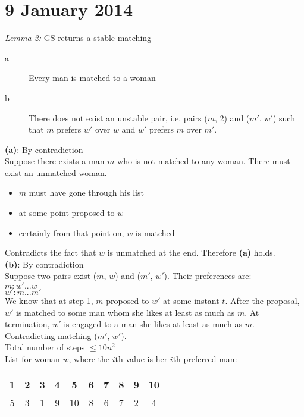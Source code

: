 \section{9 January 2014}
\emph{Lemma 2:} G{\textendash}S returns a stable matching
\begin{description}
\item[a] Every man is matched to a woman
\item[b] There does not exist an unstable pair, i.e. pairs ($m$, $2$) and ($m'$, $w'$) such that $m$ prefers $w'$ over $w$ and $w'$ prefers $m$ over $m'$.
\end{description}

\textbf{(a)}: By contradiction\\
Suppose there exists a man $m$ who is not matched to any woman. There must exist an unmatched woman.
\begin{itemize}
\item $m$ must have gone through his list
\item at some point proposed to $w$
\item certainly from that point on, $w$ is matched
\end{itemize}
Contradicts the fact that $w$ is unmatched at the end. Therefore \textbf{(a)} holds.\\

\textbf{(b)}: By contradiction\\
Suppose two pairs exist ($m$, $w$) and ($m'$, $w'$). Their preferences are:\\
$m: w'...w$\\
$w': m...m'$\\
We know that at step 1, $m$ proposed to $w'$ at some instant $t$. After the proposal, $w'$ is matched to some man whom she likes at least as much as $m$. At termination, $w'$ is engaged to a man she likes at least as much as $m$. Contradicting matching ($m'$, $w'$).\\

Total number of steps $\leq 10n^2$\\
List for woman $w$, where the $i$th value is her $i$th preferred man:\\
\begin{tabular}{ c c c c c c c c c c }
1 & 2 & 3 & 4 & 5 & 6 & 7 & 8 & 9 & 10 \\ \hline
\multicolumn{1}{|c|}{5} & \multicolumn{1}{|c|}{3} & \multicolumn{1}{|c|}{1} & \multicolumn{1}{|c|}{9} & \multicolumn{1}{|c|}{10} & \multicolumn{1}{|c|}{8} & \multicolumn{1}{|c|}{6} & \multicolumn{1}{|c|}{7} & \multicolumn{1}{|c|}{2} & \multicolumn{1}{|c|}{4} \\ \hline
\end{tabular}\\


